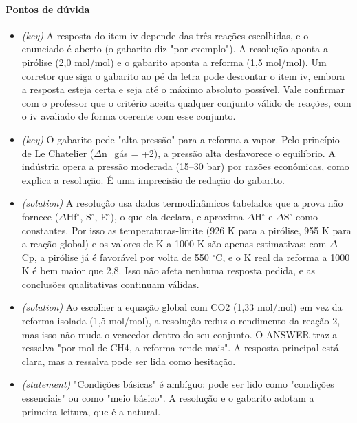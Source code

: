 \documentclass{article}%
\begin{document}
\paragraph{Pontos de dúvida}%
\begin{itemize}%
\item%
\textit{(key)} A resposta do item iv depende das três reações escolhidas, e o enunciado é aberto (o gabarito diz "por exemplo"). A resolução aponta a pirólise (2,0 mol/mol) e o gabarito aponta a reforma (1,5 mol/mol). Um corretor que siga o gabarito ao pé da letra pode descontar o item iv, embora a resposta esteja certa e seja até o máximo absoluto possível. Vale confirmar com o professor que o critério aceita qualquer conjunto válido de reações, com o iv avaliado de forma coerente com esse conjunto.%
\item%
\textit{(key)} O gabarito pede "alta pressão" para a reforma a vapor. Pelo princípio de Le Chatelier ($\Delta$n\_gás = +2), a pressão alta desfavorece o equilíbrio. A indústria opera a pressão moderada (15--30 bar) por razões econômicas, como explica a resolução. É uma imprecisão de redação do gabarito.%
\item%
\textit{(solution)} A resolução usa dados termodinâmicos tabelados que a prova não fornece ($\Delta$Hf$^\circ$, S$^\circ$, E$^\circ$), o que ela declara, e aproxima $\Delta$H$^\circ$ e $\Delta$S$^\circ$ como constantes. Por isso as temperaturas{-}limite (926 K para a pirólise, 955 K para a reação global) e os valores de K a 1000 K são apenas estimativas: com $\Delta$Cp, a pirólise já é favorável por volta de 550 $^\circ$C, e o K real da reforma a 1000 K é bem maior que 2,8. Isso não afeta nenhuma resposta pedida, e as conclusões qualitativas continuam válidas.%
\item%
\textit{(solution)} Ao escolher a equação global com CO2 (1,33 mol/mol) em vez da reforma isolada (1,5 mol/mol), a resolução reduz o rendimento da reação 2, mas isso não muda o vencedor dentro do seu conjunto. O ANSWER traz a ressalva "por mol de CH4, a reforma rende mais". A resposta principal está clara, mas a ressalva pode ser lida como hesitação.%
\item%
\textit{(statement)} "Condições básicas" é ambíguo: pode ser lido como "condições essenciais" ou como "meio básico". A resolução e o gabarito adotam a primeira leitura, que é a natural.%
\end{itemize}%
\end{document}
